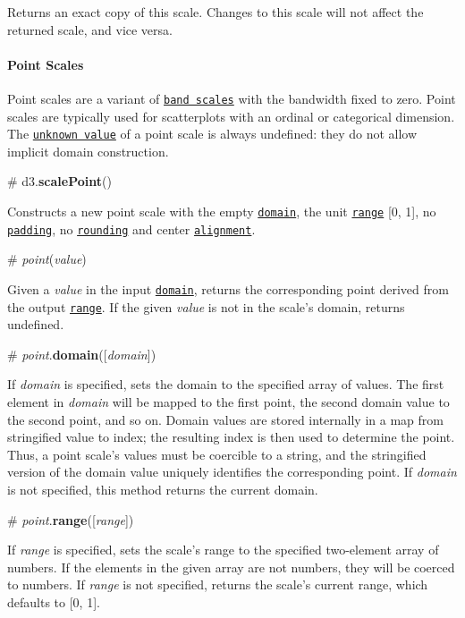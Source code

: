 Returns an exact copy of this scale. Changes to this scale will not affect the returned scale, and vice versa.

\paragraph*{Point Scales}

Point scales are a variant of \href{#band-scales}{\tt band scales} with the bandwidth fixed to zero. Point scales are typically used for scatterplots with an ordinal or categorical dimension. The \href{#ordinal_unknown}{\tt unknown value} of a point scale is always undefined\+: they do not allow implicit domain construction.



\label{_scalePoint}%
\# d3.{\bfseries scale\+Point}()

Constructs a new point scale with the empty \href{#point_domain}{\tt domain}, the unit \href{#point_range}{\tt range} \mbox{[}0, 1\mbox{]}, no \href{#point_padding}{\tt padding}, no \href{#point_round}{\tt rounding} and center \href{#point_align}{\tt alignment}.

\label{__point}%
\# {\itshape point}({\itshape value})

Given a {\itshape value} in the input \href{#point_domain}{\tt domain}, returns the corresponding point derived from the output \href{#point_range}{\tt range}. If the given {\itshape value} is not in the scale’s domain, returns undefined.

\label{_point_domain}%
\# {\itshape point}.{\bfseries domain}(\mbox{[}{\itshape domain}\mbox{]})

If {\itshape domain} is specified, sets the domain to the specified array of values. The first element in {\itshape domain} will be mapped to the first point, the second domain value to the second point, and so on. Domain values are stored internally in a map from stringified value to index; the resulting index is then used to determine the point. Thus, a point scale’s values must be coercible to a string, and the stringified version of the domain value uniquely identifies the corresponding point. If {\itshape domain} is not specified, this method returns the current domain.

\label{_point_range}%
\# {\itshape point}.{\bfseries range}(\mbox{[}{\itshape range}\mbox{]})

If {\itshape range} is specified, sets the scale’s range to the specified two-\/element array of numbers. If the elements in the given array are not numbers, they will be coerced to numbers. If {\itshape range} is not specified, returns the scale’s current range, which defaults to \mbox{[}0, 1\mbox{]}.

